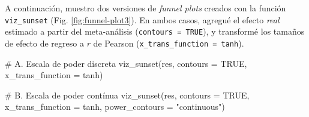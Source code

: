 \documentclass[
  bookmarksnumbered]{article}
\newenvironment{Shaded}{\begin{snugshade}}{\end{snugshade}}
\newcommand{\AttributeTok}[1]{\textcolor[rgb]{0.00,0.34,0.68}{#1}}
\newcommand{\CommentTok}[1]{\textcolor[rgb]{0.54,0.53,0.53}{#1}}
\newcommand{\ConstantTok}[1]{\textcolor[rgb]{0.67,0.33,0.00}{#1}}
\newcommand{\FunctionTok}[1]{\textcolor[rgb]{0.39,0.29,0.61}{#1}}
\newcommand{\NormalTok}[1]{\textcolor[rgb]{0.12,0.11,0.11}{#1}}
\newcommand{\StringTok}[1]{\textcolor[rgb]{0.75,0.01,0.01}{#1}}
\begin{document}
A continuación, muestro dos versiones de \emph{funnel plots} creados con la función \texttt{viz\_sunset} (Fig. \ref{fig:funnel-plot3}). En ambos casos, agregué el efecto \emph{real} estimado a partir del meta-análisis (\texttt{contours\ =\ TRUE}), y transformé los tamaños de efecto de regreso a \(r\) de Pearson (\texttt{x\_trans\_function\ =\ tanh}).

\begin{Shaded}
\begin{Highlighting}[]
\CommentTok{\# A. Escala de poder discreta}
\FunctionTok{viz\_sunset}\NormalTok{(res,}
           \AttributeTok{contours =} \ConstantTok{TRUE}\NormalTok{,}
           \AttributeTok{x\_trans\_function =}\NormalTok{ tanh)}

\CommentTok{\# B. Escala de poder contínua}
\FunctionTok{viz\_sunset}\NormalTok{(res, }
           \AttributeTok{contours =} \ConstantTok{TRUE}\NormalTok{,}
           \AttributeTok{x\_trans\_function =}\NormalTok{ tanh, }
           \AttributeTok{power\_contours =} \StringTok{"continuous"}\NormalTok{)}
\end{Highlighting}
\end{Shaded}
\end{document}
